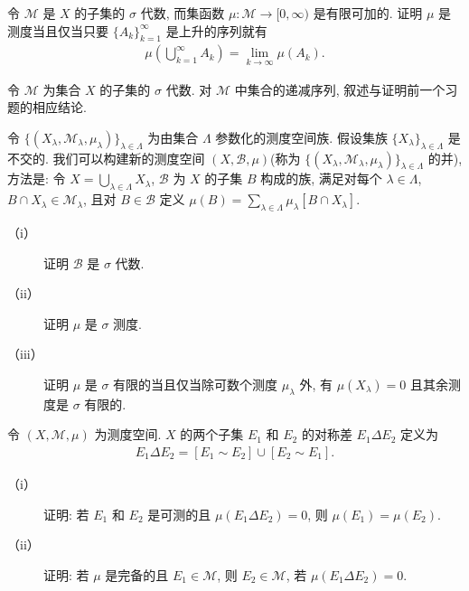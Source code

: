 \documentclass[../../main.tex]{subfiles}
\begin{document}
\begin{exercise}\label{exercise:ch17-02}
令 $\mathcal{M}$ 是 $X$ 的子集的 $\sigma$ 代数, 而集函数 $\mu:\mathcal{M}\to[0,\infty)$ 是有限可加的. 证明 $\mu$ 是测度当且仅当只要 $\{A_{k}\}_{k=1}^{\infty}$ 是上升的序列就有
\begin{align*}
\mu\left(\bigcup_{k=1}^{\infty}A_{k}\right)=\lim_{k\to\infty}\mu(A_{k}).
\end{align*}
\end{exercise}

\begin{exercise}\label{exercise:ch17-03}
令 $\mathcal{M}$ 为集合 $X$ 的子集的 $\sigma$ 代数. 对 $\mathcal{M}$ 中集合的递减序列, 叙述与证明前一个习题的相应结论.
\end{exercise}

\begin{exercise}\label{exercise:ch17-04}
令 $\{(X_{\lambda},\mathcal{M}_{\lambda},\mu_{\lambda})\}_{\lambda\in\Lambda}$ 为由集合 $\Lambda$ 参数化的测度空间族. 假设集族 $\{X_{\lambda}\}_{\lambda\in\Lambda}$ 是不交的. 我们可以构建新的测度空间 $(X,\mathcal{B},\mu)$(称为 $\{(X_{\lambda},\mathcal{M}_{\lambda},\mu_{\lambda})\}_{\lambda\in\Lambda}$ 的并), 方法是: 令 $X=\bigcup_{\lambda\in\Lambda}X_{\lambda}$, $\mathcal{B}$ 为 $X$ 的子集 $B$ 构成的族, 满足对每个 $\lambda\in\Lambda$, $B\cap X_{\lambda}\in\mathcal{M}_{\lambda}$, 且对 $B\in\mathcal{B}$ 定义 $\mu(B)=\sum_{\lambda\in\Lambda}\mu_{\lambda}[B\cap X_{\lambda}]$.
\begin{description}
\item[（i）] 证明 $\mathcal{B}$ 是 $\sigma$ 代数.
\item[（ii）] 证明 $\mu$ 是 $\sigma$ 测度.
\item[（iii）] 证明 $\mu$ 是 $\sigma$ 有限的当且仅当除可数个测度 $\mu_{\lambda}$ 外, 有 $\mu(X_{\lambda})=0$ 且其余测度是 $\sigma$ 有限的.
\end{description}
\end{exercise}

\begin{exercise}\label{exercise:ch17-05}
令 $(X,\mathcal{M},\mu)$ 为测度空间. $X$ 的两个子集 $E_{1}$ 和 $E_{2}$ 的对称差 $E_{1}\Delta E_{2}$ 定义为
\begin{align*}
E_{1}\Delta E_{2}=[E_{1}\sim E_{2}]\cup[E_{2}\sim E_{1}].
\end{align*}
\begin{description}
\item[（i）] 证明: 若 $E_{1}$ 和 $E_{2}$ 是可测的且 $\mu(E_{1}\Delta E_{2})=0$, 则 $\mu(E_{1})=\mu(E_{2})$.
\item[（ii）] 证明: 若 $\mu$ 是完备的且 $E_{1}\in\mathcal{M}$, 则 $E_{2}\in\mathcal{M}$, 若 $\mu(E_{1}\Delta E_{2})=0$.
\end{description}
\end{exercise}
\end{document}
